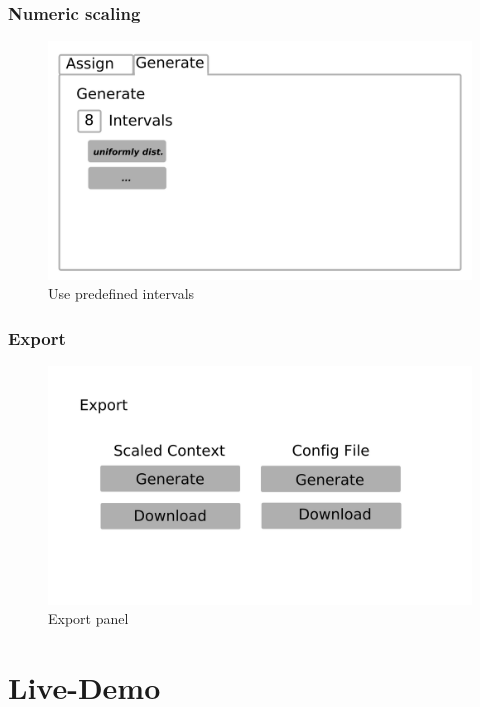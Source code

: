 \documentclass[]{beamer}
\begin{document}
	\begin{frame}
		\frametitle{Numeric scaling}
		\begin{figure}[H]
			\includegraphics[width=\linewidth]{../mock_up/num_gen.png}
			\caption{Use predefined intervals}
			\label{fig:p1}
		\end{figure}
	\end{frame}

	\begin{frame}
		\frametitle{Export}
		\begin{figure}[H]
			\includegraphics[width=\linewidth]{../mock_up/export.png}
			\caption{Export panel}
			\label{fig:p1}
		\end{figure}
	\end{frame}

\section[]{Live-Demo}
\end{document}
